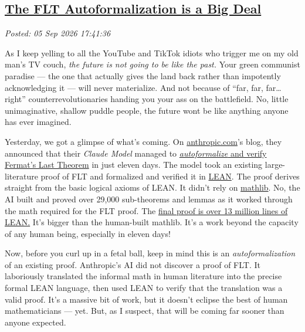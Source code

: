%

\subsection*{\href{http://analyzethedatanotthedrivel.org/2026/09/05/the-flt-autoformalization-is-a-big-deal/}{The FLT Autoformalization is a Big Deal}}


\noindent\emph{Posted: 05 Sep 2026 17:41:36}
\vspace{6pt}

As I keep yelling to all the YouTube and TikTok idiots who trigger me on
my old man's TV couch, \emph{the future is not going to be like the
past.} Your green communist paradise --- the one that actually gives the
land back rather than impotently acknowledging it --- will never
materialize. And not because of ``far, far, far\ldots{} right''
counterrevolutionaries handing you your ass on the battlefield. No,
little unimaginative, shallow puddle people, the future
won\textquotesingle t be like anything anyone has ever imagined.

Yesterday, we got a glimpse of what's coming. On
\href{https://www.anthropic.com/}{anthropic.com}'s blog, they announced
that their \emph{Claude Model} managed to
\href{https://www.anthropic.com/research/formalizing-fermats-last-theorem}{\emph{autoformalize}
and verify Fermat's Last Theorem} in just eleven days. The model took an
existing large-literature proof of FLT and formalized and verified it in
\href{https://lean-lang.org/}{LEAN}. The proof derives straight from the
basic logical axioms of LEAN. It didn't rely on
\href{https://mathlib-initiative.org/}{mathlib}. No, the AI built and
proved over 29,000 sub-theorems and lemmas as it worked through the math
required for the FLT proof. The
\href{https://github.com/anthropics/fermats-last-theorem}{final proof is
over 13 million lines of LEAN.} It's bigger than the human-built
mathlib. It's a work beyond the capacity of any human being, especially
in eleven days!

Now, before you curl up in a fetal ball, keep in mind this is an
\emph{autoformalization} of an existing proof. Anthropic's AI did not
discover a proof of FLT. It laboriously translated the informal math in
human literature into the precise formal LEAN language, then used LEAN
to verify that the translation was a valid proof. It's a massive bit of
work, but it doesn't eclipse the best of human mathematicians --- yet.
But, as I suspect, that will be coming far sooner than anyone expected.

